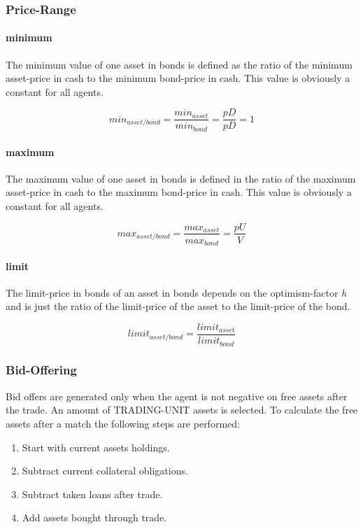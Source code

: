 \documentclass[Bachelorarbeit.tex]{subfiles}
\begin{document}
\subsubsection{Price-Range}

\paragraph{minimum}
The minimum value of one asset in bonds is defined as the ratio of the minimum asset-price in cash to the minimum bond-price in cash. This value is obviously a constant for all agents.

\begin{equation}
min_{asset/bond} = \frac{min_{asset}}{min_{bond}} = \frac{pD}{pD} = 1
\end{equation}
 
\paragraph{maximum}
The maximum value of one asset in bonds is defined in the ratio of the maximum asset-price in cash to the maximum bond-price in cash. This value is obviously a constant for all agents.

\begin{equation}
max_{asset/bond} = \frac{max_{asset}}{max_{bond}} = \frac{pU}{V}
\end{equation}

\paragraph{limit}
The limit-price in bonds of an asset in bonds depends on the optimism-factor \textit{h} and is just the ratio of the limit-price of the asset to the limit-price of the bond.

\begin{equation}
limit_{asset/bond} = \frac{limit_{asset}}{limit_{bond}}
\end{equation}

\subsubsection{Bid-Offering}
Bid offers are generated only when the agent is not negative on free assets after the trade. An amount of TRADING-UNIT assets is selected. To calculate the free assets after a match the following steps are performed:

\begin{enumerate}
\item Start with current assets holdings.
\item Subtract current collateral obligations.
\item Subtract taken loans after trade.
\item Add assets bought through trade.
\end{enumerate}
\end{document}
